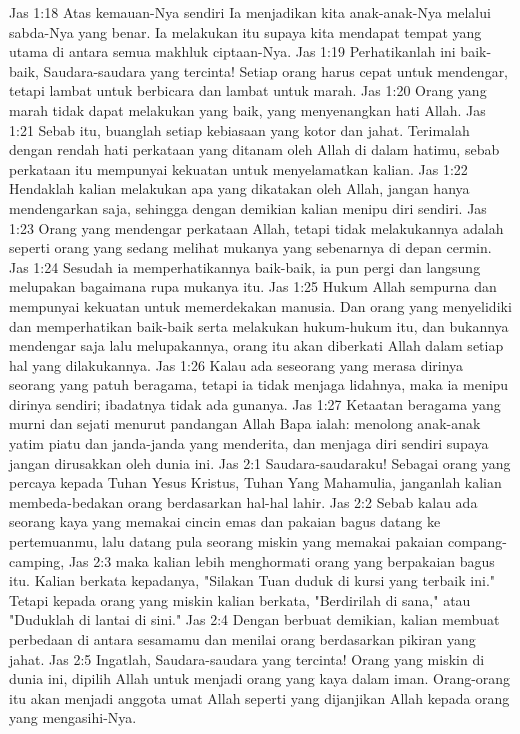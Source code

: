 Jas 1:18  Atas kemauan-Nya sendiri Ia menjadikan kita anak-anak-Nya melalui sabda-Nya yang benar. Ia melakukan itu supaya kita mendapat tempat yang utama di antara semua makhluk ciptaan-Nya.
Jas 1:19  Perhatikanlah ini baik-baik, Saudara-saudara yang tercinta! Setiap orang harus cepat untuk mendengar, tetapi lambat untuk berbicara dan lambat untuk marah.
Jas 1:20  Orang yang marah tidak dapat melakukan yang baik, yang menyenangkan hati Allah.
Jas 1:21  Sebab itu, buanglah setiap kebiasaan yang kotor dan jahat. Terimalah dengan rendah hati perkataan yang ditanam oleh Allah di dalam hatimu, sebab perkataan itu mempunyai kekuatan untuk menyelamatkan kalian.
Jas 1:22  Hendaklah kalian melakukan apa yang dikatakan oleh Allah, jangan hanya mendengarkan saja, sehingga dengan demikian kalian menipu diri sendiri.
Jas 1:23  Orang yang mendengar perkataan Allah, tetapi tidak melakukannya adalah seperti orang yang sedang melihat mukanya yang sebenarnya di depan cermin.
Jas 1:24  Sesudah ia memperhatikannya baik-baik, ia pun pergi dan langsung melupakan bagaimana rupa mukanya itu.
Jas 1:25  Hukum Allah sempurna dan mempunyai kekuatan untuk memerdekakan manusia. Dan orang yang menyelidiki dan memperhatikan baik-baik serta melakukan hukum-hukum itu, dan bukannya mendengar saja lalu melupakannya, orang itu akan diberkati Allah dalam setiap hal yang dilakukannya.
Jas 1:26  Kalau ada seseorang yang merasa dirinya seorang yang patuh beragama, tetapi ia tidak menjaga lidahnya, maka ia menipu dirinya sendiri; ibadatnya tidak ada gunanya.
Jas 1:27  Ketaatan beragama yang murni dan sejati menurut pandangan Allah Bapa ialah: menolong anak-anak yatim piatu dan janda-janda yang menderita, dan menjaga diri sendiri supaya jangan dirusakkan oleh dunia ini.
Jas 2:1  Saudara-saudaraku! Sebagai orang yang percaya kepada Tuhan Yesus Kristus, Tuhan Yang Mahamulia, janganlah kalian membeda-bedakan orang berdasarkan hal-hal lahir.
Jas 2:2  Sebab kalau ada seorang kaya yang memakai cincin emas dan pakaian bagus datang ke pertemuanmu, lalu datang pula seorang miskin yang memakai pakaian compang-camping,
Jas 2:3  maka kalian lebih menghormati orang yang berpakaian bagus itu. Kalian berkata kepadanya, "Silakan Tuan duduk di kursi yang terbaik ini." Tetapi kepada orang yang miskin kalian berkata, "Berdirilah di sana," atau "Duduklah di lantai di sini."
Jas 2:4  Dengan berbuat demikian, kalian membuat perbedaan di antara sesamamu dan menilai orang berdasarkan pikiran yang jahat.
Jas 2:5  Ingatlah, Saudara-saudara yang tercinta! Orang yang miskin di dunia ini, dipilih Allah untuk menjadi orang yang kaya dalam iman. Orang-orang itu akan menjadi anggota umat Allah seperti yang dijanjikan Allah kepada orang yang mengasihi-Nya.

